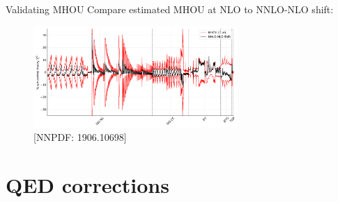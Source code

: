 \documentclass[aspectratio=169, 8pt,t]{beamer}
\begin{document}
\begin{frame}{Validating MHOU}
  Compare estimated MHOU at NLO to NNLO-NLO shift:
  \begin{figure}
    \includegraphics[width=0.69\textwidth]{figures/shift_diag_cov_comparison_7pt_global.pdf}
    \caption*{{\color{gray}\small [NNPDF: 1906.10698]}}
  \end{figure}
\end{frame}



\section*{QED corrections}
\end{document}
